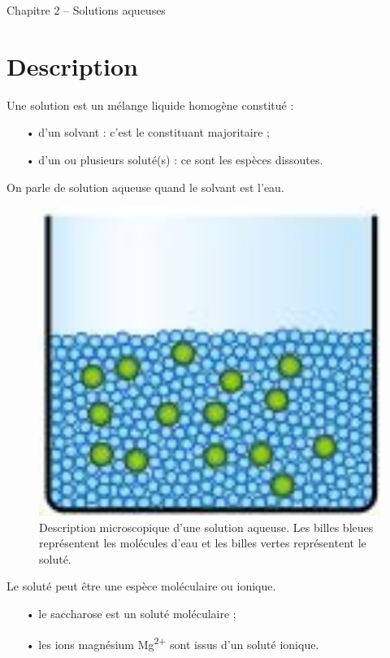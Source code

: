 \documentclass[12pt,a4paper]{article}
\begin{document}
\begin{header}
Chapitre 2 -- Solutions aqueuses
\end{header}

\section{Description}

\begin{definition}
Une solution est un mélange liquide homogène constitué :
\begin{itemize}
\item[•] d'un solvant : c'est le constituant majoritaire ;
\item[•] d'un ou plusieurs soluté(s) : ce sont les espèces dissoutes.
\end{itemize}
On parle de solution aqueuse quand le solvant est l'eau.
\end{definition}

\begin{figure}[h]
\center
\includegraphics[scale=0.4]{../images/solution_aqueuse.png}
\caption{Description microscopique d'une solution aqueuse.
Les billes bleues représentent les molécules d'eau et les billes vertes représentent le soluté.}
\end{figure}

\begin{remarque}
Le soluté peut être une espèce moléculaire ou ionique.
\end{remarque}
\begin{exemple}
\begin{itemize}
\item[•] le saccharose est un soluté moléculaire ;
\item[•] les ions magnésium Mg\textsuperscript{2+} sont issus d'un soluté ionique.
\end{itemize}
\end{exemple}
\end{document}
